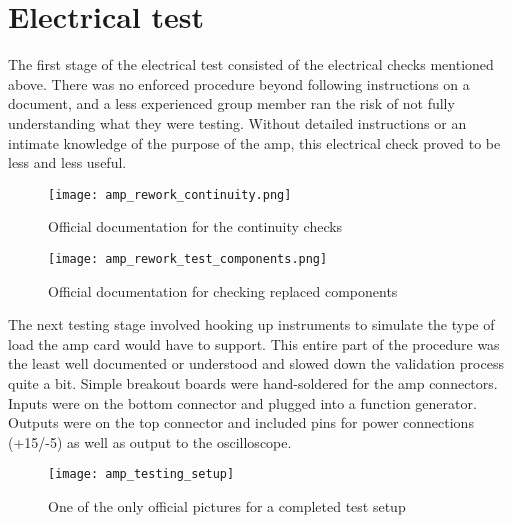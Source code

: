\section{Electrical test}
The first stage of the electrical test consisted of the electrical checks mentioned above. There was no enforced procedure beyond following instructions on a document, and a less experienced group member ran the risk of not fully understanding what they were testing. Without detailed instructions or an intimate knowledge of the purpose of the amp, this electrical check proved to be less and less useful. \par
\begin{figure}[!htb]
	\texttt{[image: amp\_rework\_continuity.png]}
	\centering
	\caption{Official documentation for the continuity checks}
	\centering
\end{figure}
\begin{figure}[!htb]
	\texttt{[image: amp\_rework\_test\_components.png]}
	\centering
	\caption{Official documentation for checking replaced components}
	\centering
\end{figure}
The next testing stage involved hooking up instruments to simulate the type of load the amp card would have to support. This entire part of the procedure was the least well documented or understood and slowed down the validation process quite a bit. Simple breakout boards were hand-soldered for the amp connectors. Inputs were on the bottom connector and plugged into a function generator. Outputs were on the top connector and included pins for power connections (+15/-5) as well as output to the oscilloscope.
\begin{figure}[!htb]
	\centering
	\texttt{[image: amp\_testing\_setup]}
	\caption{One of the only official pictures for a completed test setup}
\end{figure}
